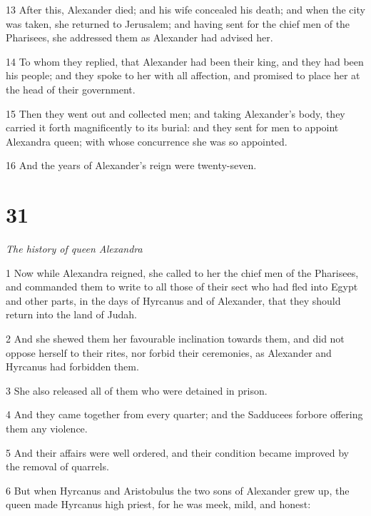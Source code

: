 \par 13 After this, Alexander died; and his wife concealed his death; and when the city was taken, she returned to Jerusalem; and having sent for the chief men of the Pharisees, she addressed them as Alexander had advised her. 

\par 14 To whom they replied, that Alexander had been their king, and they had been his people; and they spoke to her with all affection, and promised to place her at the head of their government.

\par 15 Then they went out and collected men; and taking Alexander’s body, they carried it forth magnificently to its burial: and they sent for men to appoint Alexandra queen; with whose concurrence she was so appointed. 

\par 16 And the years of Alexander’s reign were twenty-seven. 

\chapter{31}

\par \textit{The history of queen Alexandra}

\par 1 Now while Alexandra reigned, she called to her the chief men of the Pharisees, and commanded them to write to all those of their sect who had fled into Egypt and other parts, in the days of Hyrcanus and of Alexander, that they should return into the land of Judah. 

\par 2 And she shewed them her favourable inclination towards them, and did not oppose herself to their rites, nor forbid their ceremonies, as Alexander and Hyrcanus had forbidden them. 

\par 3 She also released all of them who were detained in prison. 

\par 4 And they came together from every quarter; and the Sadducees forbore offering them any violence. 

\par 5 And their affairs were well ordered, and their condition became improved by the removal of quarrels. 

\par 6 But when Hyrcanus and Aristobulus the two sons of Alexander grew up, the queen made Hyrcanus high priest, for he was meek, mild, and honest: 


